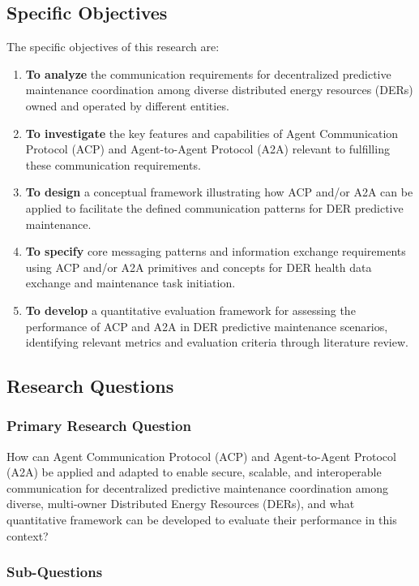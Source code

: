 \documentclass[12pt,a4paper]{article}
\begin{document}
\subsection{Specific Objectives}

The specific objectives of this research are:
\begin{enumerate}
    \item \textbf{To analyze} the communication requirements for decentralized predictive maintenance coordination among diverse distributed energy resources (DERs) owned and operated by different entities.
    \item \textbf{To investigate} the key features and capabilities of Agent Communication Protocol (ACP) and Agent-to-Agent Protocol (A2A) relevant to fulfilling these communication requirements.
    \item \textbf{To design} a conceptual framework illustrating how ACP and/or A2A can be applied to facilitate the defined communication patterns for DER predictive maintenance.
    \item \textbf{To specify} core messaging patterns and information exchange requirements using ACP and/or A2A primitives and concepts for DER health data exchange and maintenance task initiation.
    \item \textbf{To develop} a quantitative evaluation framework for assessing the performance of ACP and A2A in DER predictive maintenance scenarios, identifying relevant metrics and evaluation criteria through literature review.
\end{enumerate}

\subsection{Research Questions}

\subsubsection{Primary Research Question}

How can Agent Communication Protocol (ACP) and Agent-to-Agent Protocol (A2A) be applied and adapted to enable secure, scalable, and interoperable communication for decentralized predictive maintenance coordination among diverse, multi-owner Distributed Energy Resources (DERs), and what quantitative framework can be developed to evaluate their performance in this context?

\subsubsection{Sub-Questions}
\end{document}
